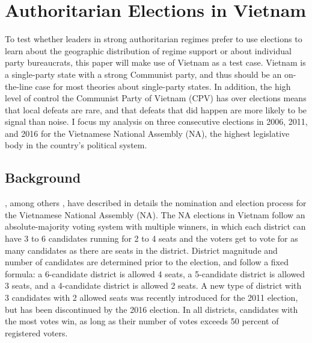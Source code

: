 \documentclass[12pt]{article}\usepackage[]{graphicx}\usepackage[]{color}
\newcommand{\1}{\mathbbm{1}}
\begin{document}
\section{Authoritarian Elections in Vietnam}
\label{sec:vietnam}
To test whether leaders in strong authoritarian regimes prefer to use elections to learn about the geographic distribution of regime support or about individual party bureaucrats, this paper will make use of Vietnam as a test case. Vietnam is a single-party state with a strong Communist party, and thus should be an on-the-line case for most theories about single-party states. In addition, the high level of control the Communist Party of Vietnam (CPV) has over elections \citep{MaleskySchuler2011} means that local defeats are rare, and that defeats that did happen are more likely to be signal than noise. I focus my analysis on three consecutive elections in 2006, 2011, and 2016 for the Vietnamese National Assembly (NA), the highest legislative body in the country's political system.

\subsection{Background}

\cite{MaleskySchuler2011}, among others \citep[e.g][]{Gainsborough2005}, have described in details the nomination and election process for the Vietnamese National Assembly (NA). The NA elections in Vietnam follow an absolute-majority voting system with multiple winners, in which each district can have 3 to 6 candidates running for 2 to 4 seats and the voters get to vote for as many candidates as there are seats in the district. District magnitude and number of candidates are determined prior to the election, and follow a fixed formula: a 6-candidate district is allowed 4 seats, a 5-candidate district is allowed 3 seats, and a 4-candidate district is allowed 2 seats. A new type of district with 3 candidates with 2 allowed seats was recently introduced for the 2011 election, but has been discontinued by the 2016 election. In all districts, candidates with the most votes win, as long as their number of votes exceeds 50 percent of registered voters.
\end{document}
